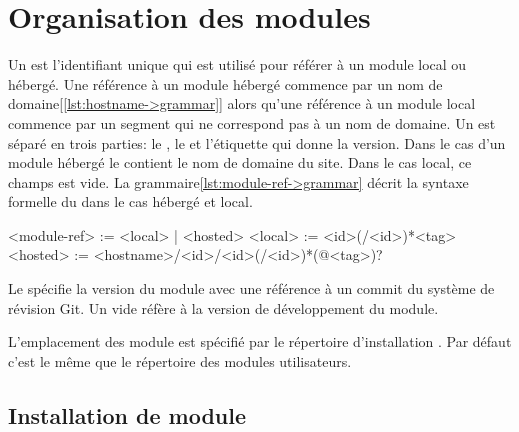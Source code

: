 \section{Organisation des modules}

Un  est l'identifiant unique qui est utilisé pour référer
à un module local ou hébergé. Une référence à un module hébergé commence par un
nom de domaine[\ref{lst:hostname->grammar}] alors qu'une référence à un module
local commence par un segment qui ne correspond pas à un nom de domaine.  Un
 est séparé en trois parties: le , le
 et l'étiquette qui donne la version. Dans le cas d'un module
hébergé le  contient le nom de domaine du site. Dans le cas
local, ce champs est vide.  La grammaire\ref{lst:module-ref->grammar} décrit la
syntaxe formelle du  dans le cas hébergé et local.


\begin{center}
  \begin{mplisting}{0.8}
<module-ref> := <local> | <hosted>
<local>      := <id>(/<id>)*<tag>
<hosted>     := <hostname>/<id>/<id>(/<id>)*(@<tag>)?
\end{mplisting}
  \label{lst:module-ref->grammar}
\end{center}

Le  spécifie la version du module avec une référence à
un commit du système de révision Git. Un  vide réfère
à la version de développement du module.

L'emplacement des module est spécifié par le répertoire d'installation
. Par défaut c'est le même que le répertoire des
modules utilisateurs.


\subsection{Installation de module}

